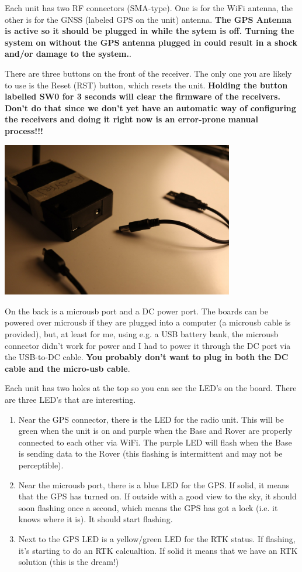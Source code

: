 \documentclass[usletter]{article}
\begin{document}
Each unit has two RF connectors (SMA-type). One is for the WiFi antenna, the
other is for the GNSS (labeled GPS on the unit) antenna. \textbf{The GPS Antenna is active so it should be
plugged in while the sytem is off. Turning the system on without the GPS
antenna plugged in could result in a shock and/or damage to the system.}. 

There are three buttons on the front of the receiver. The only one you are
likely to use is the Reset (RST) button, which resets the unit.
\textbf{Holding the button labelled SW0 for 3 seconds will clear the firmware
of the receivers. Don't do that since we don't yet have an automatic way of
configuring the receivers and doing it right now  is an error-prone manual
process!!!} 

\begin{center} 
\includegraphics[width=4in]{receiver-back} 
\end{center} 

On the back is a microusb port and a DC power port. The boards can be powered
over microusb if they are plugged into a computer (a microusb cable is
provided), but, at least for me, using e.g. a USB battery bank, the microusb
connector didn't work for power and I had to power it through the DC port via
the USB-to-DC cable. \textbf{You probably don't want to plug in both the DC
cable and the micro-usb cable}. 

Each unit has two holes at the top so you can see the LED's on the board. There are three LED's that are interesting. 
\begin{enumerate} 
  \item Near the GPS connector, there is the LED for the radio unit. This will be green when the unit is on and purple when the Base and Rover are properly connected to each other via WiFi. The purple LED will flash when the Base is sending data to the Rover (this flashing is intermittent and may not be perceptible). 
  \item Near the microusb port, there is a blue LED for the GPS. If solid, it means that the GPS has turned on. If outside with a good view to the sky, it should soon flashing once a second,  which means the GPS has got a lock (i.e. it knows where it is). It should start flashing. 
  \item Next to the GPS LED is a yellow/green LED for the RTK status. If flashing, it's starting to do an RTK calcualtion. If solid it means that we have an RTK solution (this is the dream!)
\end{enumerate}
\end{document}
